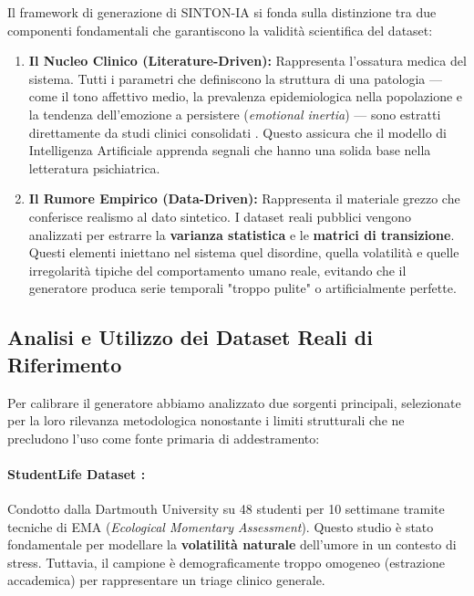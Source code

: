 Il framework di generazione di SINTON-IA si fonda sulla distinzione tra due componenti fondamentali che garantiscono la validità scientifica del dataset:
\begin{enumerate}
    \item \textbf{Il Nucleo Clinico (Literature-Driven):} Rappresenta l'ossatura medica del sistema. Tutti i parametri che definiscono la struttura di una patologia --- come il tono affettivo medio, la prevalenza epidemiologica nella popolazione e la tendenza dell'emozione a persistere (\textit{emotional inertia}) --- sono estratti direttamente da studi clinici consolidati \cite{kuppens2010inertia, who2023depression, karyotaki2015dropout}. Questo assicura che il modello di Intelligenza Artificiale apprenda segnali che hanno una solida base nella letteratura psichiatrica.
    \item \textbf{Il Rumore Empirico (Data-Driven):} Rappresenta il materiale grezzo che conferisce realismo al dato sintetico. I dataset reali pubblici vengono analizzati per estrarre la \textbf{varianza statistica} e le \textbf{matrici di transizione}. Questi elementi iniettano nel sistema quel disordine, quella volatilità e quelle irregolarità tipiche del comportamento umano reale, evitando che il generatore produca serie temporali "troppo pulite" o artificialmente perfette.
\end{enumerate}

\subsection{Analisi e Utilizzo dei Dataset Reali di Riferimento}
\label{subsec:analisi_dataset_depression}

Per calibrare il generatore abbiamo analizzato due sorgenti principali, selezionate per la loro rilevanza metodologica nonostante i limiti strutturali che ne precludono l'uso come fonte primaria di addestramento:

\paragraph{StudentLife Dataset \cite{studentlife_dataset}:} 
Condotto dalla Dartmouth University su 48 studenti per 10 settimane tramite tecniche di EMA (\textit{Ecological Momentary Assessment}). Questo studio è stato fondamentale per modellare la \textbf{volatilità naturale} dell'umore in un contesto di stress. Tuttavia, il campione è demograficamente troppo omogeneo (estrazione accademica) per rappresentare un triage clinico generale.

